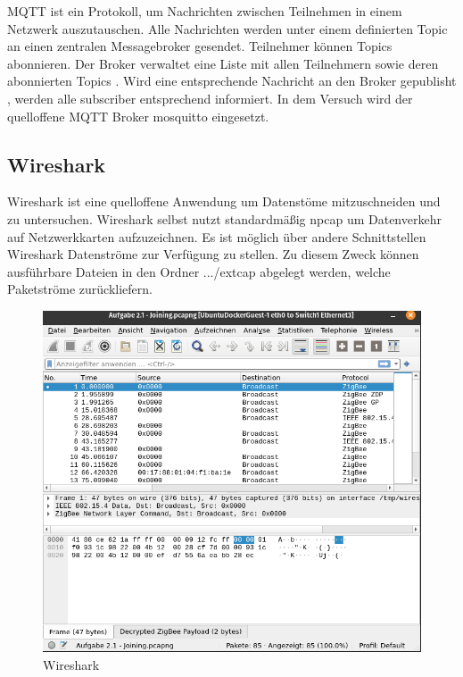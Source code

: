 MQTT \cite{mqtt} ist ein Protokoll, um Nachrichten zwischen Teilnehmen in einem Netzwerk auszutauschen. Alle Nachrichten werden unter einem definierten \grqq Topic \grqq{} 
an einen zentralen Messagebroker gesendet. Teilnehmer können \grqq Topics \grqq{} abonnieren. Der Broker verwaltet eine Liste mit allen Teilnehmern sowie 
deren abonnierten \grqq Topics \grqq{}. Wird eine entsprechende Nachricht an den Broker \grqq gepublisht \grqq{}, werden alle \grqq subscriber \grqq{} entsprechend informiert.
In dem Versuch wird der quelloffene MQTT Broker \grqq mosquitto\grqq{} eingesetzt. 

\subsection{Wireshark}

Wireshark ist eine quelloffene Anwendung um Datenstöme mitzuschneiden und zu untersuchen. Wireshark selbst nutzt standardmäßig \grqq npcap \grqq{} um Datenverkehr 
auf Netzwerkkarten aufzuzeichnen. Es ist möglich über andere Schnittstellen Wireshark Datenströme zur Verfügung zu stellen. Zu diesem Zweck
können ausführbare Dateien in den Ordner \grqq .../extcap \grqq{} abgelegt werden, welche 
Paketströme zurückliefern. 

\begin{figure}[H]
  \centering
  \includegraphics[width=1\textwidth]{media/wireshark.png}
  \caption{Wireshark}
\end{figure}

